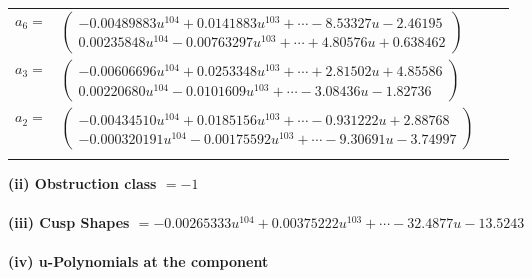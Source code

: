 \documentclass[1p]{elsarticle_modified}
\theoremstyle{definition}
\begin{document}
\begin{tabular}{m{7pt} m{180pt} m{7pt} m{180pt} }
\flushright $a_{6}=$&$\begin{pmatrix}-0.00489883 u^{104}+0.0141883 u^{103}+\cdots-8.53327 u-2.46195\\0.00235848 u^{104}-0.00763297 u^{103}+\cdots+4.80576 u+0.638462\end{pmatrix}$ \\
\flushright $a_{3}=$&$\begin{pmatrix}-0.00606696 u^{104}+0.0253348 u^{103}+\cdots+2.81502 u+4.85586\\0.00220680 u^{104}-0.0101609 u^{103}+\cdots-3.08436 u-1.82736\end{pmatrix}$ \\
\flushright $a_{2}=$&$\begin{pmatrix}-0.00434510 u^{104}+0.0185156 u^{103}+\cdots-0.931222 u+2.88768\\-0.000320191 u^{104}-0.00175592 u^{103}+\cdots-9.30691 u-3.74997\end{pmatrix}$\\&\end{tabular}
\flushleft \textbf{(ii) Obstruction class $= -1$}\\~\\
\flushleft \textbf{(iii) Cusp Shapes $= -0.00265333 u^{104}+0.00375222 u^{103}+\cdots-32.4877 u-13.5243$}\\~\\
\newpage\renewcommand{\arraystretch}{1}
\flushleft \textbf{(iv) u-Polynomials at the component}\newline \\
\end{document}
